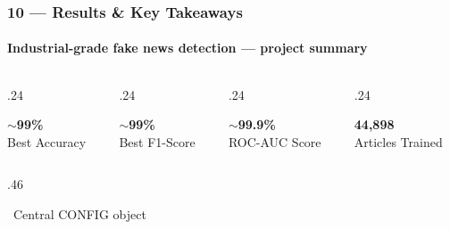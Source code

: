 \documentclass[aspectratio=169,10pt]{beamer}
\begin{document}
\begin{frame}[t]
\frametitle{10 --- Results \& Key Takeaways}
\framesubtitle{Industrial-grade fake news detection --- project summary}
\vspace{-0.5cm}
\begin{columns}[T]
\begin{column}{.24\textwidth}
  \begin{tcolorbox}[statbox={BlueL},colframe=ABlue]
    {\Large\bfseries\color{ABlue}$\sim$99\%}\\[2pt]{\tiny\color{ABlue}Best Accuracy}
  \end{tcolorbox}
\end{column}
\begin{column}{.24\textwidth}
  \begin{tcolorbox}[statbox={GreenL},colframe=AGreen]
    {\Large\bfseries\color{AGreen}$\sim$99\%}\\[2pt]{\tiny\color{AGreen}Best F1-Score}
  \end{tcolorbox}
\end{column}
\begin{column}{.24\textwidth}
  \begin{tcolorbox}[statbox={PurpleL},colframe=APurple]
    {\Large\bfseries\color{APurple}$\sim$99.9\%}\\[2pt]{\tiny\color{APurple}ROC-AUC Score}
  \end{tcolorbox}
\end{column}
\begin{column}{.24\textwidth}
  \begin{tcolorbox}[statbox={OrangeL},colframe=AOrange]
    {\Large\bfseries\color{AOrange}44,898}\\[2pt]{\tiny\color{AOrange}Articles Trained}
  \end{tcolorbox}
\end{column}
\end{columns}
\vspace{.1cm}
\begin{columns}[T]
\begin{column}{.46\textwidth}
  \begin{tcolorbox}[mycard={BlueMid}{ABlue},title={\footnotesize\textbf{Industrial Additions}},
      colbacktitle=NavyML,coltitle=white]
    \scriptsize
    \ Central CONFIG object\\[1pt]

\end{tcolorbox}
\end{column}
\end{columns}
\end{frame}
\end{document}
